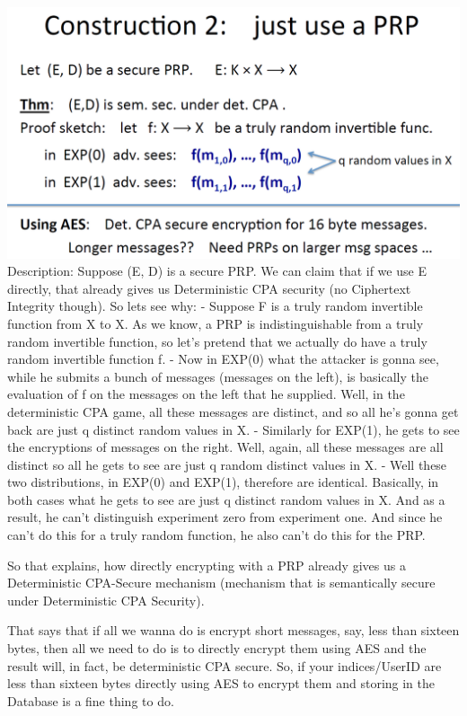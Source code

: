 \documentclass[11pt]{article}
\makeatletter
\def\maxwidth{\ifdim\Gin@nat@width>\linewidth\linewidth
    \else\Gin@nat@width\fi}
\let\Oldincludegraphics\includegraphics
\renewcommand{\includegraphics}[1]{\Oldincludegraphics[width=.8\maxwidth]{#1}}
\makeatother
\begin{document}
\includegraphics{./Images/DEfromPRP.png} Description: Suppose (E, D) is
a secure PRP. We can claim that if we use E directly, that already gives
us Deterministic CPA security (no Ciphertext Integrity though). So lets
see why: - Suppose F is a truly random invertible function from X to X.
As we know, a PRP is indistinguishable from a truly random invertible
function, so let's pretend that we actually do have a truly random
invertible function f. - Now in EXP(0) what the attacker is gonna see,
while he submits a bunch of messages (messages on the left), is
basically the evaluation of f on the messages on the left that he
supplied. Well, in the deterministic CPA game, all these messages are
distinct, and so all he's gonna get back are just q distinct random
values in X. - Similarly for EXP(1), he gets to see the encryptions of
messages on the right. Well, again, all these messages are all distinct
so all he gets to see are just q random distinct values in X. - Well
these two distributions, in EXP(0) and EXP(1), therefore are identical.
Basically, in both cases what he gets to see are just q distinct random
values in X. And as a result, he can't distinguish experiment zero from
experiment one. And since he can't do this for a truly random function,
he also can't do this for the PRP.

So that explains, how directly encrypting with a PRP already gives us a
Deterministic CPA-Secure mechanism (mechanism that is semantically
secure under Deterministic CPA Security).

That says that if all we wanna do is encrypt short messages, say, less
than sixteen bytes, then all we need to do is to directly encrypt them
using AES and the result will, in fact, be deterministic CPA secure. So,
if your indices/UserID are less than sixteen bytes directly using AES to
encrypt them and storing in the Database is a fine thing to do.
\end{document}

